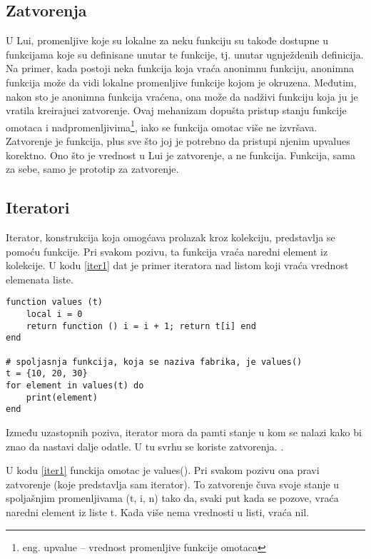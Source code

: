 \documentclass[a4paper]{article}
\begin{document}


\subsection{Zatvorenja}
\label{sec:zatvorenja}


U Lui, promenljive koje su lokalne za neku funkciju su takođe dostupne u funkcijama koje su definisane unutar te funkcije, tj. unutar ugnježdenih definicija. Na primer, kada postoji neka funkcija koja vraća anonimnu funkciju, anonimna funkcija može da vidi lokalne promenljive funkcije kojom je okruzena. Međutim, nakon sto je anonimna funkcija vraćena, ona može da nadživi funkciju koja ju je vratila kreirajuci zatvorenje. Ovaj mehanizam dopušta pristup stanju funkcije omotaca i nadpromenljivima\footnote{eng. upvalue -- vrednost promenljive funkcije omotaca}, iako se funkcija omotac više ne izvršava.
Zatvorenje je funkcija, plus sve što joj je potrebno da pristupi njenim upvalues korektno. Ono što je vrednost u Lui je zatvorenje, a ne funkcija. Funkcija, sama za sebe, samo je prototip za zatvorenje.


\subsection{Iteratori}
\label{sec:iteratori}


Iterator, konstrukcija koja omogćava prolazak kroz kolekciju, predstavlja se pomoću funkcije. Pri svakom pozivu, ta funkcija vraća naredni element iz kolekcije. U kodu \ref{iter1} dat je primer iteratora nad listom koji vraća vrednost elemenata liste.

\begin{lstlisting}[caption={Primer iteratora nad listom},frame=single, label=iter1]
function values (t)
	local i = 0
	return function () i = i + 1; return t[i] end
end

# spoljasnja funkcija, koja se naziva fabrika, je values()
t = {10, 20, 30}
for element in values(t) do
	print(element)
end
\end{lstlisting}

Između uzastopnih poziva, iterator mora da pamti stanje u kom se nalazi kako bi znao da nastavi dalje odatle. U tu svrhu se koriste zatvorenja. \cite{lua_org_iterators}.

U kodu \ref{iter1} funckija omotac je values(). Pri svakom pozivu ona pravi zatvorenje (koje predstavlja sam iterator). To zatvorenje čuva svoje stanje u spoljašnjim promenljivama (t, i, n) tako da, svaki put kada se pozove, vraća naredni element iz liste t. Kada više nema vrednosti u listi, vraća nil.
\end{document}
